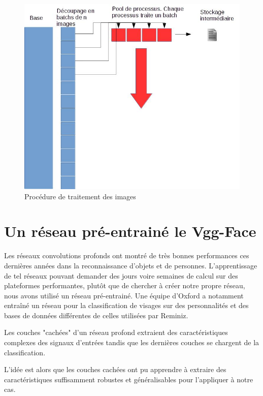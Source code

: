 \documentclass[12pt,french]{report}
\begin{document}
\begin{figure}[H]
		\begin{center}%
			\includegraphics[scale=0.5]{image_rapport/pipeline.jpg}
		\end{center}%
	\caption{Procédure de traitement des images}\label{"pipeline"}%
\end{figure}



\section{Un réseau pré-entrainé le Vgg-Face}
Les réseaux convolutions profonds ont montré de très bonnes performances ces dernières années dans la reconnaissance d'objets et de personnes. L'apprentissage de tel réseaux pouvant demander des jours voire semaines de calcul sur des plateformes performantes, plutôt que de chercher à créer notre propre réseau, nous avons utilisé un réseau pré-entrainé. 
Une équipe d'Oxford \cite{vgg} a notamment entraîné un réseau pour la classification de visages sur des personnalités et des bases de données différentes de celles utilisées par Reminiz.

Les couches "cachées" d'un réseau profond extraient des caractéristiques complexes des signaux d'entrées tandis que les dernières couches se chargent de la classification.

L'idée est alors que les couches cachées ont pu apprendre à extraire des caractéristiques suffisamment robustes et généralisables pour l'appliquer à notre cas.
\end{document}
